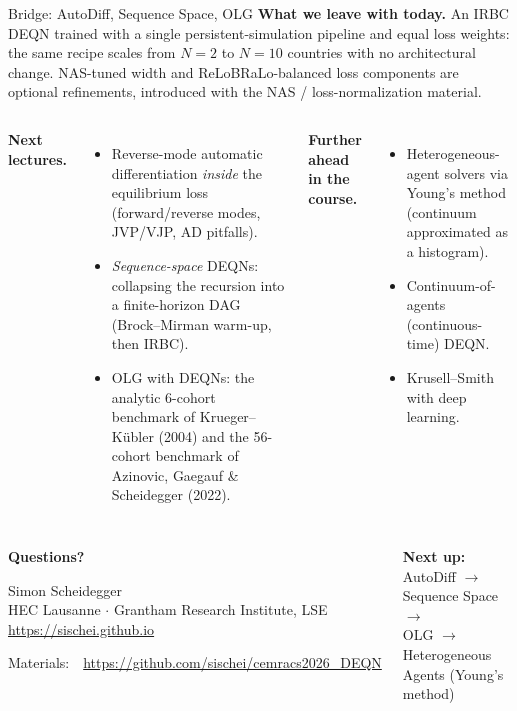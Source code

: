 \documentclass[aspectratio=169,11pt]{beamer}
\begin{document}
\begin{frame}[shrink=20]{Bridge: AutoDiff, Sequence Space, OLG}
\textbf{What we leave with today.}  An IRBC DEQN trained with a single persistent-simulation pipeline and equal loss weights: the same recipe scales from $N=2$ to $N=10$ countries with no architectural change.  NAS-tuned width and ReLoBRaLo-balanced loss components are optional refinements, introduced with the NAS / loss-normalization material.

\vspace{0.4em}
\begin{columns}[T]
\textbf{Next lectures.}
\begin{itemize}
    \item Reverse-mode automatic differentiation \emph{inside} the equilibrium loss (forward/reverse modes, JVP/VJP, AD pitfalls).
    \item \emph{Sequence-space} DEQNs: collapsing the recursion into a finite-horizon DAG (Brock--Mirman warm-up, then IRBC).
    \item OLG with DEQNs: the analytic 6-cohort benchmark of Krueger--K\"ubler (2004) and the 56-cohort benchmark of Azinovic, Gaegauf \& Scheidegger (2022).
\end{itemize}

\textbf{Further ahead in the course.}
\begin{itemize}
    \item Heterogeneous-agent solvers via Young's method (continuum approximated as a histogram).
    \item Continuum-of-agents (continuous-time) DEQN.
    \item Krusell--Smith with deep learning.
\end{itemize}
\end{columns}
\end{frame}

\begin{frame}{}
\begin{columns}[c]
\begin{center}
{\Huge \textcolor{uzhblue}{\textbf{Questions?}}}

\vspace{1.0cm}
{\large Simon Scheidegger}\\[4pt]
{\small HEC Lausanne $\cdot$ Grantham Research Institute, LSE}\\[4pt]
\url{https://sischei.github.io}

\vspace{0.6cm}
{\small Materials:~~\url{https://github.com/sischei/cemracs2026_DEQN}}
\end{center}

\begin{center}
\textbf{Next up:}\\[6pt]
{\large AutoDiff $\to$ Sequence Space $\to$\\[2pt]
OLG $\to$ Heterogeneous Agents (Young's method)}\\[12pt]
\end{center}
\end{columns}
\end{frame}
\end{document}
